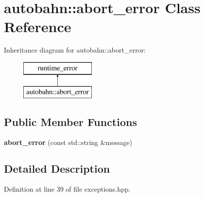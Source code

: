 \hypertarget{classautobahn_1_1abort__error}{}\section{autobahn\+:\+:abort\+\_\+error Class Reference}
\label{classautobahn_1_1abort__error}
Inheritance diagram for autobahn\+:\+:abort\+\_\+error\+:\begin{figure}[H]
\begin{center}
\leavevmode
\includegraphics[height=2.000000cm]{classautobahn_1_1abort__error}
\end{center}
\end{figure}
\subsection*{Public Member Functions}
\begin{DoxyCompactItemize}
\item 
{\bfseries abort\+\_\+error} (const std\+::string \&message)\hypertarget{classautobahn_1_1abort__error_a8144c7a932bf86c342d527f85d1eddbd}{}\label{classautobahn_1_1abort__error_a8144c7a932bf86c342d527f85d1eddbd}

\end{DoxyCompactItemize}


\subsection{Detailed Description}


Definition at line 39 of file exceptions.\+hpp.

